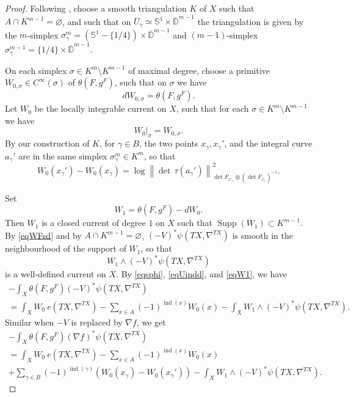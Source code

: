 \documentclass[11pt]{article}
\numberwithin{equation}{section}
\theoremstyle{plain}
\theoremstyle{definition}
\theoremstyle{remark}
\newcommand{\bbD}{\mathbb{D}}
\newcommand{\bbS}{\mathbb{S}}
\DeclareMathOperator{\ind}{ind}
\DeclareMathOperator{\Supp}{Supp}
\let\ol\overline
\begin{document}
\begin{proof}
Following \cite[\S IV.c)]{BZ92},
choose a smooth triangulation $K$ of $X$ such that $A\cap
K^{m-1}=\varnothing$, and such that on $\ol{U}_{\gamma}\simeq \bbS^{1}\times
\ol{\bbD}^{m-1}$ the
triangulation is given by the $m$-simplex
$\sigma^{m}_{\gamma}=(\bbS^{1}-\{1/4\})\times
\ol{\bbD}^{m-1}$ and $(m-1)$-simplex
$\sigma^{m-1}_{\gamma}=\{1/4\}\times \ol{\bbD}^{m-1}$.

On each simplex $\sigma\in K^{m}\setminus K^{m-1}$ of maximal degree, choose a
primitive $W_{0,\sigma}\in C^{\infty}(\sigma)$ of $\theta(F,g^{F})$,
such that on $\sigma$ we have
\begin{equation*}
dW_{0,\sigma}=\theta(F,g^{F}).
\end{equation*}
Let $W_{0}$ be the locally integrable current on $X$, such that
for each $\sigma\in K^{m}\setminus K^{m-1}$ we have
\begin{equation*}
W_{0}|_{\sigma}=W_{0,\sigma}.
\end{equation*}
By our construction of $K$, for $\gamma\in B$, the two points
$x_{\gamma},x_{\gamma}'$, and the integral curve $a_{\gamma}'$ are in the same simplex $\sigma^{m}_{\gamma}\in
K^{m}$, so that
\begin{equation}\label{W0W0}
W_{0}(x_{\gamma}')-W_{0}(x_{\gamma})=\log
\left\|{\det\,}\tau(a_{\gamma}')\right\|^{2}_{\det
F_{x'_{\gamma}}\otimes (\det
F_{x_{\gamma}})^{-1}}.
\end{equation}

Set
\begin{equation}\label{eqW1}
W_{1}=\theta(F,g^{F})-dW_{0}.
\end{equation}
Then $W_{1}$ is a closed
current of degree $1$ on $X$ such that $\Supp(W_{1})\subset
K^{m-1}$. By \eqref{eqWFsd} and by $A\cap K^{m-1}=\varnothing$, $(-V)^{*}\psi(TX,\nabla^{TX})$ is
smooth in the neighbourhood of the support of $W_{1}$, so that
\begin{equation*}
W_{1}\wedge (-V)^{*}\psi(TX,\nabla^{TX})
\end{equation*}
is a well-defined current on $X$. By \eqref{eqsphi}, \eqref{eqUindd}, and \eqref{eqW1}, we have
\begin{multline}\label{eqVtoW1}
-\int_{X}\theta(F,g^{F}) (-V)^{*}\psi(TX,\nabla^{TX})\\
=\int_{X}W_{0}\ e(TX,\nabla^{TX})
-\sum_{x\in A}(-1)^{\ind(x)}W_{0}(x)
-\int_{X}W_{1}\wedge (-V)^{*}\psi(TX,\nabla^{TX}).
\end{multline}
Similar when $-V$ is replaced by $\nabla f$, we get
\begin{multline}\label{eqnftoW1}
-\int_{X}\theta(F,g^{F}) (\nabla f)^{*}\psi(TX,\nabla^{TX})\\
=\int_{X}W_{0}\ e(TX,\nabla^{TX})
-\sum_{x\in A}(-1)^{\ind(x)}W_{0}(x)\\
+\sum_{\gamma\in
B}(-1)^{\ind(\gamma)}(W_{0}(x_{\gamma})-W_{0}(x_{\gamma}')) -\int_{X}W_{1}\wedge (-V)^{*}\psi(TX,\nabla^{TX}).
\end{multline}


\end{proof}
\end{document}
